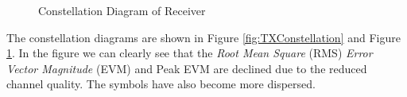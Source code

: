 \documentclass[11pt]{article}
\numberwithin{figure}{section}
\numberwithin{equation}{section}
\begin{document}
\begin{figure}[!h]
    \centering
    \caption{Constellation Diagram of Receiver}
    \label{fig:RXConstellation}
\end{figure}
The constellation diagrams are shown in Figure \ref{fig:TXConstellation} and Figure \ref{fig:RXConstellation}. In the figure we can clearly see that the \textit{Root Mean Square} (RMS) \textit{Error Vector Magnitude} (EVM) and Peak EVM are declined due to the reduced channel quality. The symbols have also become more dispersed.
\end{document}
